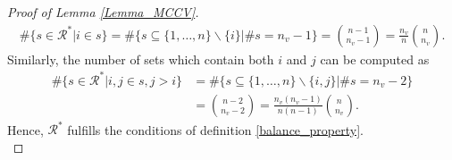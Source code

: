 \documentclass[Research_Module_ES.tex]{subfiles}
\begin{document}
\begin{proof}[Proof of Lemma \ref{Lemma_MCCV}]
	\begin{align*}
	\#\{s\in \mathcal{R}^\ast|i\in s\} = \#\{s \subseteq \{1,\dots, n\}\backslash\{i\} | \# s =n_v-1\} = \binom{n-1}{n_v-1} =\frac{n_v}{n}\binom{n}{n_v}.
	\end{align*}
	Similarly, the number of sets which contain both $i$ and $j$ can be computed as
	\begin{align*}
	\#\{s\in \mathcal{R}^\ast|i,j\in s , j>i\} &= \#\{s \subseteq \{1,\dots, n\}\backslash\{i,j\} | \# s =n_v-2\} \\
	&= \binom{n-2}{n_v-2} = \frac{n_v(n_v-1)}{n(n-1)}\binom{n}{n_v}.
	\end{align*}
	Hence, $\mathcal{R}^\ast$ fulfills the conditions of definition \ref{balance_property}. \\
\end{proof}
\end{document}
